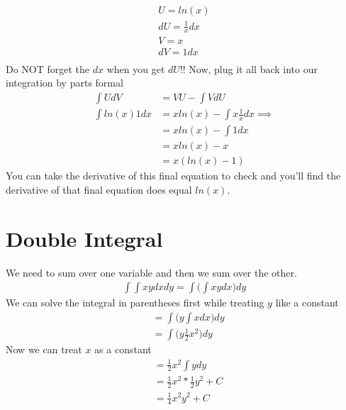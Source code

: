 \documentclass{article}
\begin{document}
\begin{align}
    U = ln(x) \\
    dU = \frac{1}{x} dx\\
    V = x \\
    dV = 1 dx\\
\end{align}
Do NOT forget the $dx$ when you get $dU$!! Now, plug it all back into our integration by parts formal 
\begin{align}
    \int U dV &= V U - \int V dU\\
    \int ln(x) 1 dx &= x ln(x) - \int x \frac{1}{x} dx \implies \\
    &= x ln(x) - \int 1 dx  \\
    & = x ln(x) - x\\
    &= x (ln(x) - 1)
\end{align}
You can take the derivative of this final equation to check and you'll find the derivative of that final equation does equal $ln(x)$.

\section{Double Integral}
We need to sum over one variable and then we sum over the other.
\begin{align}
    \int \int xy dx dy = \int \bigg(\int xy dx\bigg) dy 
\end{align}
We can solve the integral in parentheses first while treating $y$ like a constant 
\begin{align}
    &= \int \bigg( y\int x dx\bigg) dy \\
    &= \int \bigg( y\frac{1}{2} x^2 \bigg) dy
\end{align}
Now we can treat $x$ as a constant
\begin{align}
    &= \frac{1}{2} x^2 \int y dy\\
    & = \frac{1}{2} x^2 * \frac{1}{2} y^2 + C\\
    &= \frac{1}{4} x^2 y^2 + C
\end{align}
\end{document}
